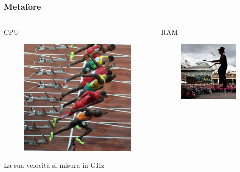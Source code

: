 \documentclass[]{beamer}
\begin{document}
\begin{frame}
\frametitle{Metafore}
\begin{columns}
\begin{column}{.3\textwidth}
  \begin{center}
  CPU
  \begin{figure}
    \includegraphics[width=\columnwidth]{img/sprint.jpg}
  \end{figure}
  La sua velocità si misura in GHz
  \end{center}
\end{column}
\begin{column}{.3\textwidth}
  \begin{center}
    RAM
    \begin{figure}
      \includegraphics[width=\columnwidth]{img/giocoliere.jpg}

\end{figure}
\end{center}
\end{column}
\end{columns}
\end{frame}
\end{document}
